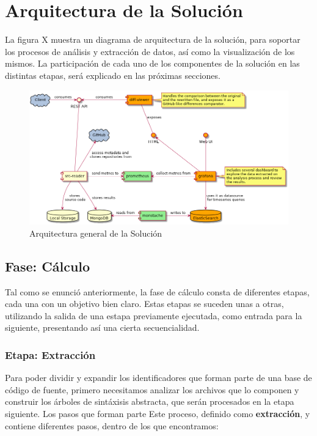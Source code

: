 \section{Arquitectura de la Solución}

La figura X muestra un diagrama de arquitectura de la solución, para
soportar los procesos de análisis y extracción de datos, así como la
visualización de los mismos.
La participación de cada uno de los componentes de la solución en las distintas
etapas, será explicado en las próximas secciones.

\begin{figure}[H]
  \includegraphics[width=12cm]{implementation/architecture_overview.png}
  \centering
  \caption{Arquitectura general de la Solución}
\end{figure}

\subsection{Fase: Cálculo}

Tal como se enunció anteriormente, la fase de cálculo consta de diferentes etapas,
cada una con un objetivo bien claro.
Estas etapas se suceden unas a otras, utilizando la salida de una estapa previamente
ejecutada, como entrada para la siguiente, presentando así una cierta secuencialidad.


\subsubsection{Etapa: Extracción}

Para poder dividir y expandir los identificadores que forman parte de una base de código de fuente, 
primero necesitamos analizar los archivos que lo componen y construir los árboles de sintáxisis
abstracta, que serán procesados en la etapa siguiente.
Los pasos que forman parte 
Este proceso, definido como \textbf{extracción}, y contiene diferentes pasos,
dentro de los que encontramos:

